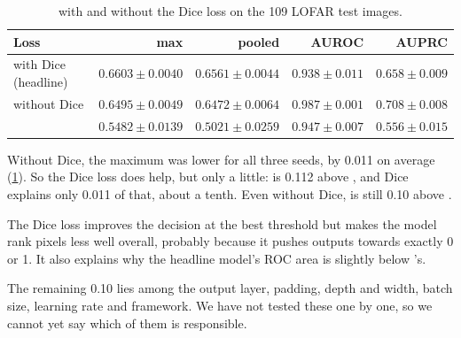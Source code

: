 \begin{table}[H]
  \centering
  \caption[Effect of the Dice loss]{\hybrid{} with and without the Dice loss on the 109 LOFAR test
    images.}
  \label{tab:dice}
  \small
  \begin{tabular}{lrrrr}
    \toprule
    Loss & max \Fone{} & pooled \Fone{} & AUROC & AUPRC \\
    \midrule
    with Dice (headline) & $0.6603 \pm 0.0040$ & $0.6561 \pm 0.0044$ & $0.938 \pm 0.011$ & $0.658 \pm 0.009$ \\
    without Dice         & $0.6495 \pm 0.0049$ & $0.6472 \pm 0.0064$ & $0.987 \pm 0.001$ & $0.708 \pm 0.008$ \\
    \tfunet{}            & $0.5482 \pm 0.0139$ & $0.5021 \pm 0.0259$ & $0.947 \pm 0.007$ & $0.556 \pm 0.015$ \\
    \bottomrule
  \end{tabular}
\end{table}

Without Dice, the maximum \Fone{} was lower for all three seeds, by 0.011 on
average (\cref{tab:dice}). So the Dice loss does help, but only a little:
\hybrid{} is 0.112 above \tfunet{}, and Dice explains only 0.011 of that, about
a tenth. Even without Dice, \hybrid{} is still 0.10 above \tfunet{}.

The Dice loss improves the
decision at the best threshold but makes the model rank pixels less well
overall, probably because it pushes outputs towards exactly 0 or 1. It also
explains why the headline model's ROC area is slightly below \tfunet{}'s.

The remaining 0.10 lies among the output layer, padding, depth and width,
batch size, learning rate and framework. We have not tested these one by one,
so we cannot yet say which of them is responsible.
